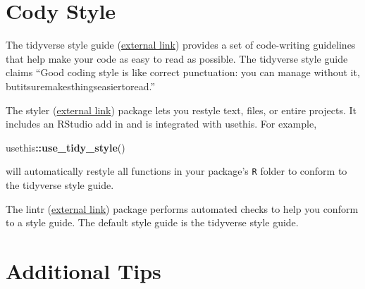 \documentclass[
]{book}
\newenvironment{Shaded}{\begin{snugshade}}{\end{snugshade}}
\newcommand{\KeywordTok}[1]{\textcolor[rgb]{0.13,0.29,0.53}{\textbf{#1}}}
\newcommand{\NormalTok}[1]{#1}
\newcommand{\OperatorTok}[1]{\textcolor[rgb]{0.81,0.36,0.00}{\textbf{#1}}}
\begin{document}
\hypertarget{style}{%
\section{Cody Style}\label{style}}

The tidyverse style guide (\href{https://style.tidyverse.org/}{external link}) provides a set of code-writing guidelines that help make your code as easy to read as possible. The tidyverse style guide claims ``Good coding style is like correct punctuation: you can manage without it, butitsuremakesthingseasiertoread.''

The styler (\href{https://styler.r-lib.org/}{external link}) package lets you restyle text, files, or entire projects. It includes an RStudio add in and is integrated with usethis. For example,

\begin{Shaded}
\begin{Highlighting}[]
\NormalTok{usethis}\OperatorTok{::}\KeywordTok{use_tidy_style}\NormalTok{()}
\end{Highlighting}
\end{Shaded}

will automatically restyle all functions in your package's \texttt{R} folder to conform to the tidyverse style guide.

The lintr (\href{https://github.com/jimhester/lintr}{external link}) package performs automated checks to help you conform to a style guide. The default style guide is the tidyverse style guide.

\hypertarget{add-tips}{%
\section{Additional Tips}\label{add-tips}}
\end{document}

